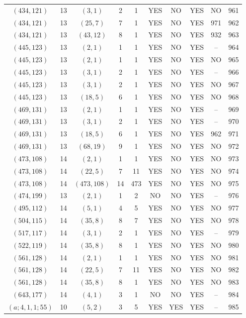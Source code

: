 \begin{longtable}{|c|c|c|c|c|c|c|c|c|c|}
$(434, 121)$ & 13 & $(3, 1)$ & 2 & 1 & YES & NO & YES & NO & 961\\
$(434, 121)$ & 13 & $(25, 7)$ & 7 & 1 & YES & NO & YES & 971 & 962\\
$(434, 121)$ & 13 & $(43, 12)$ & 8 & 1 & YES & NO & YES & 932 & 963\\
$(445, 123)$ & 13 & $(2, 1)$ & 1 & 1 & YES & NO & YES & -- & 964\\
$(445, 123)$ & 13 & $(2, 1)$ & 1 & 1 & YES & NO & YES & NO & 965\\
$(445, 123)$ & 13 & $(3, 1)$ & 2 & 1 & YES & NO & YES & -- & 966\\
$(445, 123)$ & 13 & $(3, 1)$ & 2 & 1 & YES & NO & YES & NO & 967\\
$(445, 123)$ & 13 & $(18, 5)$ & 6 & 1 & YES & NO & YES & NO & 968\\
$(469, 131)$ & 13 & $(2, 1)$ & 1 & 1 & YES & NO & YES & -- & 969\\
$(469, 131)$ & 13 & $(3, 1)$ & 2 & 1 & YES & NO & YES & -- & 970\\
$(469, 131)$ & 13 & $(18, 5)$ & 6 & 1 & YES & NO & YES & 962 & 971\\
$(469, 131)$ & 13 & $(68, 19)$ & 9 & 1 & YES & NO & YES & NO & 972\\
$(473, 108)$ & 14 & $(2, 1)$ & 1 & 1 & YES & NO & YES & NO & 973\\
$(473, 108)$ & 14 & $(22, 5)$ & 7 & 11 & YES & NO & YES & NO & 974\\
$(473, 108)$ & 14 & $(473, 108)$ & 14 & 473 & YES & NO & YES & NO & 975\\
$(474, 199)$ & 13 & $(2, 1)$ & 1 & 2 & NO & NO & YES & -- & 976\\
$(495, 112)$ & 14 & $(5, 1)$ & 4 & 5 & YES & NO & YES & NO & 977\\
$(504, 115)$ & 14 & $(35, 8)$ & 8 & 7 & YES & NO & YES & NO & 978\\
$(517, 117)$ & 14 & $(3, 1)$ & 2 & 1 & YES & NO & YES & -- & 979\\
$(522, 119)$ & 14 & $(35, 8)$ & 8 & 1 & YES & NO & YES & NO & 980\\
$(561, 128)$ & 14 & $(2, 1)$ & 1 & 1 & YES & NO & YES & NO & 981\\
$(561, 128)$ & 14 & $(22, 5)$ & 7 & 11 & YES & NO & YES & NO & 982\\
$(561, 128)$ & 14 & $(35, 8)$ & 8 & 1 & YES & NO & YES & NO & 983\\
$(643, 177)$ & 14 & $(4, 1)$ & 3 & 1 & NO & NO & YES & -- & 984\\
$(a; 4, 1, 1; 55)$ & 10 & $(5, 2)$ & 3 & 5 & YES & YES & YES & -- & 985\\

\end{longtable}
